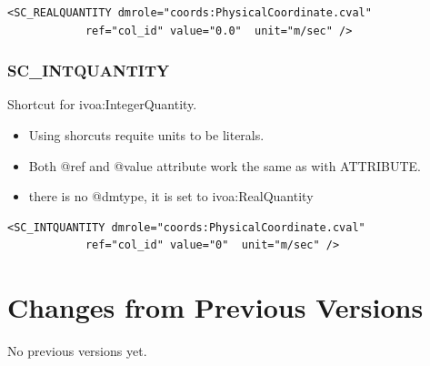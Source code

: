\documentclass[11pt,a4paper]{ivoa}
\begin{document}
\begin{lstlisting}[caption={ivoa:RealQuantity example},captionpos=b]
<SC_REALQUANTITY dmrole="coords:PhysicalCoordinate.cval"
            ref="col_id" value="0.0"  unit="m/sec" />
\end{lstlisting}

\subsubsection{SC\_INTQUANTITY}
Shortcut for ivoa:IntegerQuantity.

\begin{itemize}
    \item Using shorcuts requite units to be literals.    
    \item Both @ref and @value attribute work the same as with ATTRIBUTE.
    \item there is no @dmtype, it is set to   ivoa:RealQuantity
 \end{itemize}


\begin{lstlisting}[caption={ivoa:IntegerQuantity example},captionpos=b]
<SC_INTQUANTITY dmrole="coords:PhysicalCoordinate.cval"
            ref="col_id" value="0"  unit="m/sec" />
\end{lstlisting}

\appendix
\section{Changes from Previous Versions}

No previous versions yet.  



\end{document}
